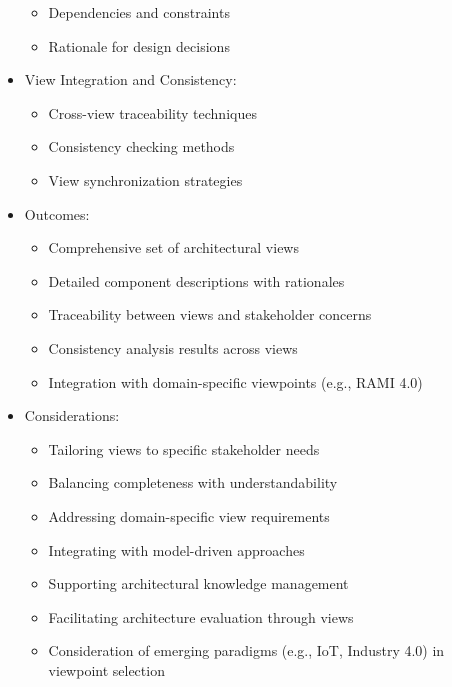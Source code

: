 \documentclass[12pt,a4paper]{article}
\begin{document}
\begin{itemize}
\begin{itemize}
        \item Dependencies and constraints
        \item Rationale for design decisions \citep{Tyree2005}
    \end{itemize}
    \item View Integration and Consistency:
    \begin{itemize}
        \item Cross-view traceability techniques \citep{Mader2009}
        \item Consistency checking methods \citep{Egyed2007}
        \item View synchronization strategies \citep{Fradet2008}
    \end{itemize}
    \item Outcomes:
    \begin{itemize}
        \item Comprehensive set of architectural views
        \item Detailed component descriptions with rationales
        \item Traceability between views and stakeholder concerns
        \item Consistency analysis results across views
        \item Integration with domain-specific viewpoints (e.g., RAMI 4.0)
    \end{itemize}
    \item Considerations:
    \begin{itemize}
        \item Tailoring views to specific stakeholder needs \citep{Rozanski2012}
        \item Balancing completeness with understandability
        \item Addressing domain-specific view requirements
        \item Integrating with model-driven approaches \citep{Schmidt2006}
        \item Supporting architectural knowledge management \citep{Farenhorst2007}
        \item Facilitating architecture evaluation through views \citep{Kazman2000}
        \item Consideration of emerging paradigms (e.g., IoT, Industry 4.0) in viewpoint selection \citep{Nakagawa2023}
    \end{itemize}
\end{itemize}
\end{document}
